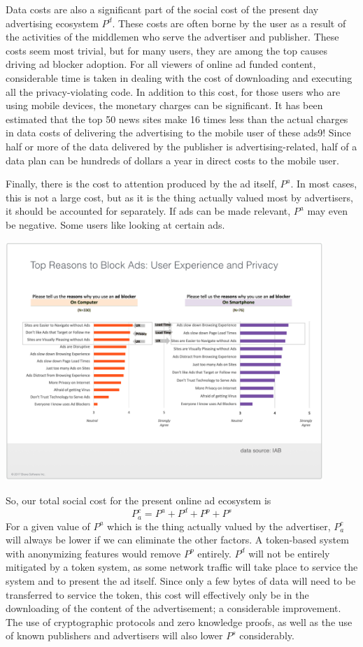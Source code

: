 \documentclass[11pt]{article}
\begin{document}
Data costs are also a significant part of the social cost of the
present day advertising ecosystem  $P^{d}$. These costs are often borne by the
user as a result of the activities of the middlemen who serve the
advertiser and publisher. These costs seem most trivial, but for many
users, they are among the top causes driving ad blocker adoption. For
all viewers of online ad funded content, considerable time is taken in
dealing with the cost of downloading and executing all the
privacy-violating code. In addition to this cost, for those users who
are using mobile devices, the monetary charges can be significant. It
has been estimated that the top 50 news sites make 16 times less than
the actual charges in data costs of delivering the advertising to the
mobile user of these ads9! Since half or more of the data delivered
by the publisher is advertising-related, half of a data plan can be
hundreds of dollars a year in direct costs to the mobile user. 

Finally, there is the cost to attention produced by the ad itself,
$P^{a}$. In most cases, this is not a large cost, but as it is the thing
actually valued most by advertisers, it should be accounted for
separately. If ads can be made relevant, $P^{a}$ may even be negative. Some
users like looking at certain ads.

\begin{center}
\includegraphics[width=0.9\textwidth]{topreasons_to_block.png}
\end{center}

So, our total social cost for the present online ad ecosystem is 
 \[P^{c}_a = P^{a} + P^{d} + P^{p} + P^{s}\]
 For a given value of $P^{a}$ which is the thing actually valued by the
 advertiser, $P^{c}_a $ will always be lower if we can eliminate the other
 factors. A token-based system with anonymizing features would remove $P^{p}$
 entirely. $P^{d}$ will not be entirely mitigated by a token system, as some
 network traffic will take place to service the system and to present
 the ad itself. Since only a few bytes of data will need to be
 transferred to service the token, this cost will effectively only be
 in the downloading of the content of the advertisement; a
 considerable improvement. The use of cryptographic protocols and zero
 knowledge proofs, as well as the use of known publishers and
 advertisers will also lower $P^{s}$ considerably.
\end{document}

